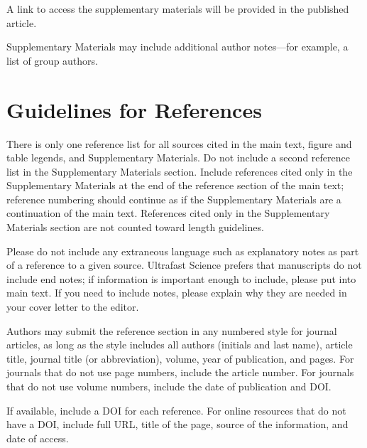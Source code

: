 \documentclass{article}
\begin{document}
A link to access the supplementary materials will be provided in the published article.

Supplementary Materials may include additional author notes—for example, a list of group authors.

\section*{Guidelines for References}
There is only one reference list for all sources cited in the main text, figure and table legends, and Supplementary Materials. Do not include a second reference list in the Supplementary Materials section. Include references cited only in the Supplementary Materials at the end of the reference section of the main text; reference numbering should continue as if the Supplementary Materials are a continuation of the main text. References cited only in the Supplementary Materials section are not counted toward length guidelines.

Please do not include any extraneous language such as explanatory notes as part of a reference to a given source. Ultrafast Science prefers that manuscripts do not include end notes; if information is important enough to include, please put into main text.  If you need to include notes, please explain why they are needed in your cover letter to the editor.

Authors may submit the reference section in any numbered style for journal articles, as long as the style includes all authors (initials and last name), article title, journal title (or abbreviation), volume, year of publication, and pages. For journals that do not use page numbers, include the article number. For journals that do not use volume numbers, include the date of publication and DOI. 

If available, include a DOI for each reference. For online resources that do not have a DOI, include full URL, title of the page, source of the information, and date of access.

\printbibliography
\end{document}
